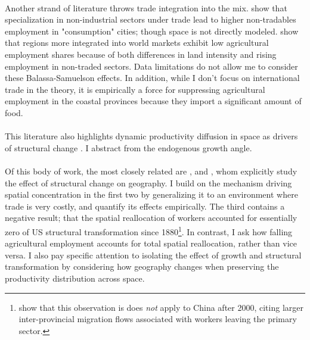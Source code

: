 \documentclass[]{article}
\begin{document}
\paragraph*{}
Another strand of literature throws trade integration into the mix. \citet{urbwoindustrialization} show that specialization in non-industrial sectors under trade lead to higher non-tradables employment in  "consumption" cities; though space is not directly modeled. \citet{rfargentina} show that regions more integrated into world markets exhibit low agricultural employment shares because of both differences in land intensity and rising employment in non-traded sectors. Data limitations do not allow me to consider these Balassa-Samuelson effects. In addition, while I don't focus on international trade in the theory, it is empirically a force for suppressing agricultural employment in the coastal provinces because they import a significant amount of food.
\paragraph*{}
This literature also highlights dynamic productivity diffusion in space as drivers of structural change \citep{spatdev}  \citep{delventhalglobenet}. I abstract from the endogenous growth angle.
\paragraph*{}
Of this body of work, the most closely related are \citet{urbstruct}, \citet{MURATA2008} and \citet{eckertpeters}, whom explicitly study the effect of structural change on geography. I build on the mechanism driving spatial concentration in the first two by generalizing it to an environment where trade is very costly, and quantify its effects empirically. The third contains a negative result; that the spatial reallocation of workers accounted for essentially zero of US structural transformation since 1880\footnote{\citet{hao2020} show that this observation is does \textit{not} apply to China after 2000, citing larger inter-provincial migration flows associated with workers leaving the primary sector.}. In contrast, I ask how falling agricultural employment accounts for total spatial reallocation, rather than vice versa. I also pay specific attention to isolating the effect of growth and structural transformation by considering how geography changes when preserving the productivity distribution across space.
\end{document}
